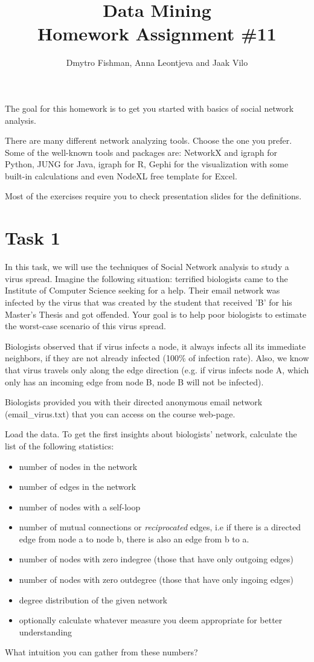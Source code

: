 \documentclass{article}
\title{Data Mining\\Homework Assignment \#11} %
\author{Dmytro Fishman, Anna Leontjeva and Jaak Vilo} %
\begin{document}
\maketitle %
The goal for this homework is to get you started with basics of social network analysis. 

There are many different network analyzing tools. Choose the one you prefer. Some of the well-known tools and packages are: NetworkX and igraph for Python, JUNG for Java, igraph for R, Gephi for the visualization with some built-in calculations and even NodeXL free template for Excel.

Most of the exercises require you to check presentation slides for the definitions.

\section*{Task 1}
In this task, we will use the techniques of Social Network analysis to study a virus spread. Imagine the following situation: terrified biologists came to the Institute of Computer Science seeking for a help. Their email network was infected by the virus that was created by the student that received 'B' for his Master's Thesis and got offended. Your goal is to help poor biologists to estimate the worst-case scenario of this virus spread. 

Biologists observed that if virus infects a node, it always infects all its immediate neighbors, if they are not already infected (100\% of infection rate). Also, we know that virus travels only along the edge direction (e.g. if virus infects node A, which only has an incoming edge from node B, node B will not be infected). 

Biologists provided you with their directed anonymous email network (email\_virus.txt) that you can access on the course web-page. 
  
Load the data. To get the first insights about biologists' network, calculate the list of the following statistics:
\begin{itemize}
\item number of nodes in the network
\item number of edges in the network
\item number of nodes with a self-loop
\item number of mutual connections or \emph{reciprocated} edges, i.e if there is a directed edge from node a to node b, there is also an edge from b to a. 
\item number of nodes with zero indegree (those that have only outgoing edges)
\item number of nodes with zero outdegree (those that have only ingoing edges)
\item degree distribution of the given network
\item optionally calculate whatever measure you deem appropriate for better understanding
\end{itemize}
What intuition you can gather from these numbers?
\end{document}
